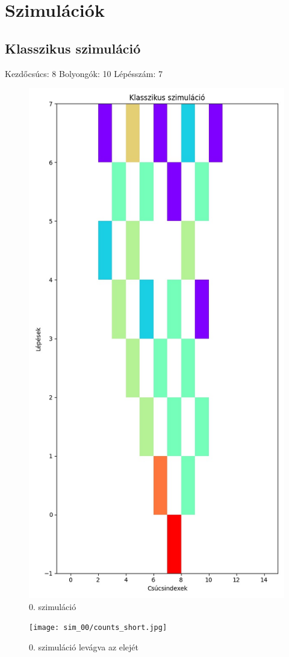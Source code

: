 \documentclass[14pt,a4paper]{article}
\begin{document}
\section{Szimulációk}
\subsection{Klasszikus szimuláció}
Kezdőcsúcs: 8
Bolyongók: 10
Lépésszám: 7
\begin{figure}[H]
\centering
\includegraphics[width = 0.7\columnwidth]{sim_00/counts.jpg}
\caption{0. szimuláció}
\end{figure}
\begin{figure}[H]
\centering
\texttt{[image: sim\_00/counts\_short.jpg]}
\caption{0. szimuláció levágva az elejét}
\end{figure}
\end{document}

